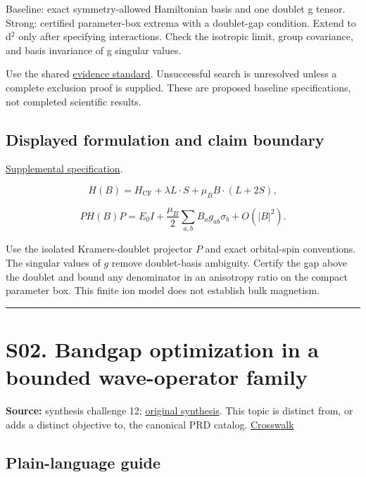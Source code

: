 \documentclass[
  11pt,
]{article}
\begin{document}
Baseline: exact symmetry-allowed Hamiltonian basis and one doublet g
tensor. Strong: certified parameter-box extrema with a doublet-gap
condition. Extend to d\ensuremath{{}^{2}} only after specifying
interactions. Check the isotropic limit, group covariance, and basis
invariance of g singular values.

Use the shared
\href{https://github.com/rick-stevens-ai/Pure-Thought/blob/main/reviews/EVIDENCE-STANDARD.md}{evidence
standard}. Unsuccessful search is unresolved unless a complete exclusion
proof is supplied. These are proposed baseline specifications, not
completed scientific results.

\subsection{Displayed formulation and claim boundary}

\href{https://github.com/rick-stevens-ai/Pure-Thought/blob/main/supplemental/S01.md}{Supplemental
specification}.

\[H(B)=H_{\mathrm{CF}}+\lambda L\cdot S+\mu_B B\cdot(L+2S),\]

\[P H(B)P=E_0I+\frac{\mu_B}{2}\sum_{a,b}B_a g_{ab}\sigma_b+O(|B|^2).\]

Use the isolated Kramers-doublet projector \(P\) and exact orbital-spin
conventions. The singular values of \(g\) remove doublet-basis
ambiguity. Certify the gap above the doublet and bound any denominator
in an anisotropy ratio on the compact parameter box. This finite ion
model does not establish bulk magnetism.

\begin{center}\rule{0.5\linewidth}{0.5pt}\end{center}

\section{S02. Bandgap optimization in a bounded wave-operator family}

\textbf{Source:} synthesis challenge 12;
\href{https://github.com/rick-stevens-ai/Pure-Thought/blob/main/NOTES/30-Most-Compelling-Pure-Thought-AI-Challenges.md}{original
synthesis}. This topic is distinct from, or adds a distinct objective
to, the canonical PRD catalog.
\href{https://github.com/rick-stevens-ai/Pure-Thought/blob/main/reviews/SYNTHESIS-CROSSWALK.md}{Crosswalk}

\subsection{Plain-language guide}
\end{document}
